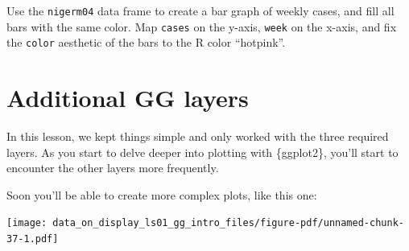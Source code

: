 \documentclass[
  letterpaper,
  DIV=11,
  numbers=noendperiod]{scrreprt}
\begin{document}
\begin{tcolorbox}[enhanced jigsaw, colframe=quarto-callout-tip-color-frame, rightrule=.15mm, opacityback=0, breakable, coltitle=black, colbacktitle=quarto-callout-tip-color!10!white, bottomrule=.15mm, leftrule=.75mm, toprule=.15mm, arc=.35mm, bottomtitle=1mm, colback=white, left=2mm, opacitybacktitle=0.6, titlerule=0mm, title=\textcolor{quarto-callout-tip-color}{\faLightbulb}\hspace{0.5em}{Practice}, toptitle=1mm]

Use the \texttt{nigerm04} data frame to create a bar graph of weekly
cases, and fill all bars with the same color. Map \texttt{cases} on the
y-axis, \texttt{week} on the x-axis, and fix the \texttt{color}
aesthetic of the bars to the R color ``hotpink''.

\end{tcolorbox}

\hypertarget{additional-gg-layers}{%
\section{Additional GG layers}\label{additional-gg-layers}}

In this lesson, we kept things simple and only worked with the three
required layers. As you start to delve deeper into plotting with
\{ggplot2\}, you'll start to encounter the other layers more frequently.

Soon you'll be able to create more complex plots, like this one:

\texttt{[image: data\_on\_display\_ls01\_gg\_intro\_files/figure-pdf/unnamed-chunk-37-1.pdf]}
\end{document}
